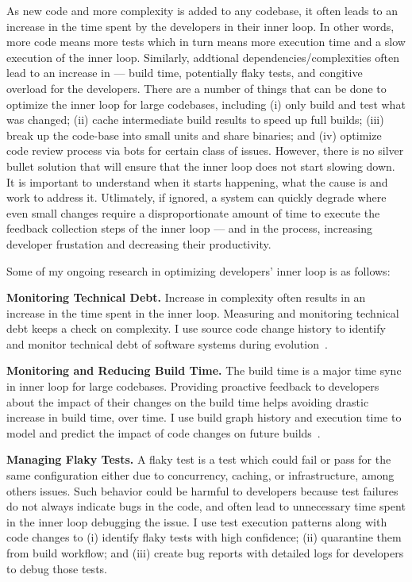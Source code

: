\documentclass[a4paper]{article}
\begin{document}
As new code and more complexity is added to any codebase, it often leads to an increase in the time spent by the developers in their inner loop. In other words, more code means more tests which in turn means more execution time and a slow execution of the inner loop. Similarly, addtional dependencies/complexities often lead to an increase in --- build time, potentially flaky tests, and congitive overload for the developers.
There are a number of things that can be done to optimize the inner loop for large codebases, including (i) only build and test what was changed; (ii) cache intermediate build results to speed up full builds; (iii) break up the code-base into small units and share binaries; and (iv) optimize code review process via bots for certain class of issues.
However, there is no silver bullet solution that will ensure that the inner loop does not start slowing down. It is important to understand when it starts happening, what the cause is and work to address it. Utlimately, if ignored, a system can quickly degrade where even small changes require a disproportionate amount of time to execute the feedback collection steps of the inner loop --- and in the process, increasing developer frustation and decreasing their productivity. 

Some of my ongoing research in optimizing developers' inner loop is as follows:  

\noindent \textbf{Monitoring Technical Debt.} Increase in complexity often results in an increase in the time spent in the inner loop. Measuring and monitoring technical debt keeps a check on complexity. I use source code change history to identify and monitor technical debt of software systems during evolution~\cite{activefiles}. 

\noindent \textbf{Monitoring and Reducing Build Time.} The build time is a major time sync in inner loop for large codebases.  Providing proactive feedback to developers about the impact of their changes on the build time helps avoiding drastic increase in build time, over time. I use build graph history and execution time to model and predict the impact of code changes on future builds~\cite{buildimpact}. 

\noindent \textbf{Managing Flaky Tests.}  A flaky test is a test which could fail or pass for the same configuration either due to concurrency, caching, or infrastructure, among others issues. Such behavior could be harmful to developers because test failures do not always indicate bugs in the code, and often lead to unnecessary time spent in the inner loop debugging the issue.  I use test execution patterns along with code changes to (i) identify flaky tests with high confidence; (ii) quarantine them from build workflow; and (iii) create bug reports with detailed logs for developers to debug those tests.
\end{document}
